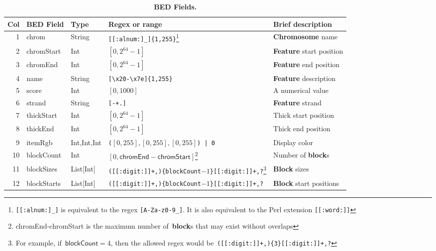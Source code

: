 \documentclass[11pt]{article}
\begin{document}
\begin{savenotes}
  \begin{table}
    \begin{adjustwidth}{-0.5in}{-0.5in}
      \begin{tabularx}{\linewidth}{r l l l L}
        \toprule
        Col & \acs{BED} Field & Type & Regex or range & Brief description \\
        & \textsf{chrom}
        & String
        & \texttt{[[:alnum:]\_]\{1,255\}}\footnote{\texttt{[[:alnum:]\_]} is equivalent to the \ac{regex} \texttt{[A-Za-z0-9\_]}. %
        It is also equivalent to the Perl extension \texttt{[[:word:]]}}
        & \textbf{Chromosome} name \\

        2 & \textsf{chromStart} & Int & $[0, 2^{64}-1]$ & \textbf{Feature} start position \\
        3 & \textsf{chromEnd} & Int & $[0, 2^{64} -1]$ & \textbf{Feature} end position \\
        4 & \textsf{name} & String & \texttt{[{\textbackslash}x20-{\textbackslash}x7e]\{1,255\}} & \textbf{Feature} description \\
        5 & \textsf{score} & Int & $[0, 1000]$ & A numerical value \\
        6 & \textsf{strand} & String & \texttt{[-+.]} & \textbf{Feature} strand \\
        7 & \textsf{thickStart} & Int & $[0, 2^{64}-1]$ & Thick start position \\
        8 & \textsf{thickEnd} & Int & $[0, 2^{64}-1]$ & Thick end position \\
        9 & \textsf{itemRgb} & Int,Int,Int & \texttt{(}$[0, 255], [0,255], [0,255]$\texttt{) | 0} & Display color \\ %

        10
        & \textsf{blockCount}
        & Int
        & $[0, \textsf{chromEnd}-\textsf{chromStart}]$\footnote{\textsf{chromEnd}-\textsf{chromStart} is the maximum number of~\textbf{block}s that may exist without overlaps}
        & Number of \textbf{block}s \\

        11
        & \textsf{blockSizes}
        & List[Int]
        & \texttt{([[:digit:]]+,)\{\textsf{blockCount}$-1$\}[[:digit:]]+,?}\footnote{For example, if~$\textsf{blockCount} = 4$, then the allowed \ac{regex} would be~\texttt{([[:digit:]]+,)\{3\}[[:digit:]]+,?}}
        & \textbf{Block} sizes \\

        12 & \textsf{blockStarts} & List[Int] & \texttt{([[:digit:]]+,)\{\textsf{blockCount}$-1$\}[[:digit:]]+,?} & \textbf{Block} start positions \\
        \bottomrule
      \end{tabularx}
    \end{adjustwidth}
    \caption{\textbf{\acs{BED} Fields.}}\label{tab:fields}
  \end{table}
\end{savenotes}
\end{document}

